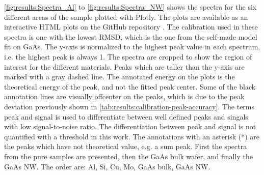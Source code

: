 \cref{fig:results:Spectra_Al} to \cref{fig:results:Spectra_NW} shows the spectra for the six different areas of the sample plotted with Plotly.
The plots are available as an interactive HTML plots on the GitHub repository
.
The calibration used in these spectra is one with the lowest RMSD, which is the one from the self-made model fit on GaAs.
The y-axis is normalized to the highest peak value in each spectrum, i.e. the highest peak is always 1. %
The spectra are cropped to show the region of interest for the different materials.
Peaks which are taller than the y-axis are marked with a gray dashed line.
The annotated energy on the plots is the theoretical energy of the peak, and not the fitted peak center.
Some of the black annotation lines are visually offcenter on the peaks, which is due to the peak deviation previously shown in \cref{tab:results:calibration-peak-accuracy}.
The terms peak and signal is used to differentiate between well defined peaks and singals with low signal-to-noise ratio.
The differentiation between peak and signal is not quantified with a threshold in this work. %
The annotations with an asterisk (*) are the peaks which have not theoretical value, e.g. a sum peak.
First the spectra from the pure samples are presented, then the GaAs bulk wafer, and finally the GaAs NW.
The order are: Al, Si, Cu, Mo, GaAs bulk, GaAs NW.



